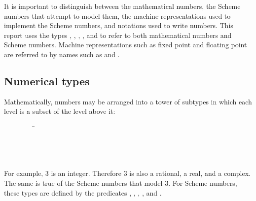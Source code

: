 It is important to distinguish between the mathematical numbers, the
Scheme numbers that attempt to model them, the machine representations
used to implement the Scheme numbers, and notations used to write numbers.
This report uses the types , , ,
, and  to refer to both mathematical numbers
and Scheme numbers.  Machine representations such as fixed point and
floating point are referred to by names such as  and
.


\subsection{Numerical types}
\label{numericaltypes}



\vest Mathematically, numbers may be arranged into a tower of subtypes
in which each level is a subset of the level above it:
\begin{tabbing}
\ \ \ \ \ \ \ \ \ \= \\
\>  \\
\>  \\
\>  \\
\>  
\end{tabbing}

For example, 3 is an integer.  Therefore 3 is also a rational,
a real, and a complex.  The same is true of the Scheme numbers
that model 3.  For Scheme numbers, these types are defined by the
predicates , , , ,
and .

